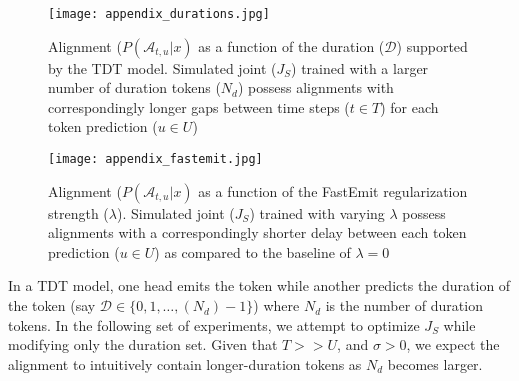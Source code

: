 \documentclass{article}
\begin{document}
\begin{figure} [t]
    \centering
    \begin{minipage}{0.45\textwidth}
        \centering
        \texttt{[image: appendix\_durations.jpg]}
        \caption{Alignment ($P(\mathcal{A}_{t, u} | x)$ as a function of the duration ($\mathcal{D}$) supported by the TDT model. Simulated joint ($J_S$) trained with a larger number of duration tokens ($N_d$) possess alignments with correspondingly longer gaps between time steps ($t \in T$) for each token prediction ($u \in U$)}
       \label{fig:appendix_durations}
    \end{minipage}\hfill
    \begin{minipage}{0.45\textwidth}
        \centering
        \texttt{[image: appendix\_fastemit.jpg]} 
        \caption{Alignment ($P(\mathcal{A}_{t, u} | x)$ as a function of the FastEmit regularization strength ($\lambda$). Simulated joint ($J_S$) trained with varying $\lambda$ possess alignments with a correspondingly shorter delay between each token prediction ($u \in U$) as compared to the baseline of $\lambda = 0$}
        \label{fig:appendix_fastemit}
    \end{minipage}
\end{figure}

\iffalse {
\begin{figure}[b]
\centering
    \texttt{[image: appendix\_durations.jpg]}
    \caption{Alignment ($P(\mathcal{A}_{t, u} | x)$ as a function of the duration ($\mathcal{D}$) supported by the TDT model. Simulated joint ($J_S$) trained with a larger number of duration tokens ($N_d$) possess alignments with correspondingly longer gaps between time steps ($t \in T$) for each token prediction ($u \in U$)}
    \label{fig:appendix_durations}
\end{figure}

\begin{figure}[h!]
    \centering
    \texttt{[image: appendix\_fastemit.jpg]}
    \caption{Alignment ($P(\mathcal{A}_{t, u} | x)$ as a function of the FastEmit regularization strength ($\lambda$). Simulated joint ($J_S$) trained with varying $\lambda$ possess alignments with a correspondingly shorter delay between each token prediction ($u \in U$) as compared to the baseline of $\lambda = 0$}
    \label{fig:appendix_fastemit}
\end{figure}
} \fi

In a TDT model, one head emits the token while another predicts the duration of the token (say $\mathcal{D} \in \{ 0, 1, \ldots, (N_d)-1 \}$) where $N_d$ is the number of duration tokens. In the following set of experiments, we attempt to optimize $J_S$  while modifying only the duration set. Given that $T >> U$, and $\sigma > 0$, we expect the alignment to intuitively contain longer-duration tokens as $N_d$ becomes larger.
\end{document}
